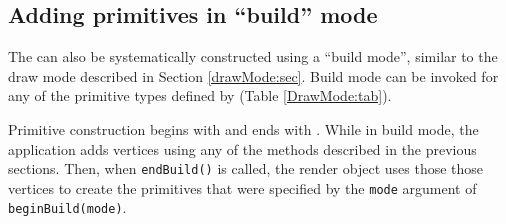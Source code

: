 \subsection{Adding primitives in ``build'' mode}

The  can also be
systematically constructed using a ``build mode'', similar to the draw
mode described in Section \ref{drawMode:sec}.  Build mode can be
invoked for any of the primitive types defined by
(Table \ref{DrawMode:tab}).

Primitive construction begins with
 and
ends with . While
in build mode, the application adds vertices using any of the methods
described in the previous sections. Then, when {\tt endBuild()} is
called, the render object uses those those vertices to create the
primitives that were specified by the {\tt mode} argument of {\tt
beginBuild(mode)}.

